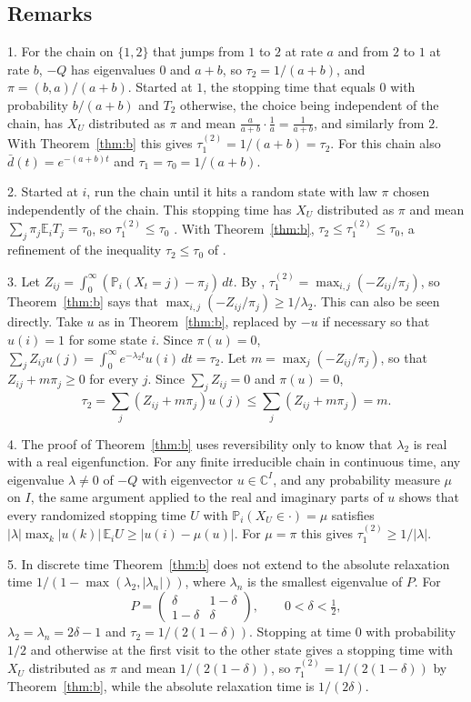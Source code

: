 \documentclass[11pt]{amsart}
\numberwithin{equation}{section}
\newcommand{\Pp}{\mathbb P}
\newcommand{\E}{\mathbb E}
\newcommand{\dbar}{\bar d}
\begin{document}
\subsection*{Remarks}
1. For the chain on $\{1,2\}$ that jumps from $1$ to $2$ at rate $a$ and from $2$ to $1$ at rate $b$, $-Q$ has eigenvalues $0$ and $a+b$, so $\tau_2=1/(a+b)$, and $\pi=(b,a)/(a+b)$. Started at $1$, the stopping time that equals $0$ with probability $b/(a+b)$ and $T_2$ otherwise, the choice being independent of the chain, has $X_U$ distributed as $\pi$ and mean $\frac a{a+b}\cdot\frac1a=\frac1{a+b}$, and similarly from $2$. With Theorem~\ref{thm:b} this gives $\tau_1^{(2)}=1/(a+b)=\tau_2$. For this chain also $\dbar(t)=e^{-(a+b)t}$ and $\tau_1=\tau_0=1/(a+b)$.

2. Started at $i$, run the chain until it hits a random state with law $\pi$ chosen independently of the chain. This stopping time has $X_U$ distributed as $\pi$ and mean $\sum_j\pi_j\E_iT_j=\tau_0$, so $\tau_1^{(2)}\le\tau_0$ \cite[Section~4.3.2]{AF}. With Theorem~\ref{thm:b}, $\tau_2\le\tau_1^{(2)}\le\tau_0$, a refinement of the inequality $\tau_2\le\tau_0$ of \cite[Lemma~4.24]{AF}.

3. Let $Z_{ij}=\int_0^\infty(\Pp_i(X_t=j)-\pi_j)\,dt$. By \cite[(4.47)]{AF}, $\tau_1^{(2)}=\max_{i,j}(-Z_{ij}/\pi_j)$, so Theorem~\ref{thm:b} says that $\max_{i,j}(-Z_{ij}/\pi_j)\ge1/\lambda_2$. This can also be seen directly. Take $u$ as in Theorem~\ref{thm:b}, replaced by $-u$ if necessary so that $u(i)=1$ for some state $i$. Since $\pi(u)=0$, $\sum_jZ_{ij}u(j)=\int_0^\infty e^{-\lambda_2t}u(i)\,dt=\tau_2$. Let $m=\max_j(-Z_{ij}/\pi_j)$, so that $Z_{ij}+m\pi_j\ge0$ for every $j$. Since $\sum_jZ_{ij}=0$ and $\pi(u)=0$,
\[
\tau_2=\sum_j(Z_{ij}+m\pi_j)u(j)\le\sum_j(Z_{ij}+m\pi_j)=m.
\]

4. The proof of Theorem~\ref{thm:b} uses reversibility only to know that $\lambda_2$ is real with a real eigenfunction. For any finite irreducible chain in continuous time, any eigenvalue $\lambda\ne0$ of $-Q$ with eigenvector $u\in\mathbb C^I$, and any probability measure $\mu$ on $I$, the same argument applied to the real and imaginary parts of $u$ shows that every randomized stopping time $U$ with $\Pp_i(X_U\in\cdot)=\mu$ satisfies $|\lambda|\max_k|u(k)|\,\E_iU\ge|u(i)-\mu(u)|$. For $\mu=\pi$ this gives $\tau_1^{(2)}\ge1/|\lambda|$.

5. In discrete time Theorem~\ref{thm:b} does not extend to the absolute relaxation time $1/(1-\max(\lambda_2,|\lambda_n|))$, where $\lambda_n$ is the smallest eigenvalue of $P$. For
\[
P=\begin{pmatrix}\delta&1-\delta\\1-\delta&\delta\end{pmatrix},\qquad0<\delta<\tfrac12,
\]
$\lambda_2=\lambda_n=2\delta-1$ and $\tau_2=1/(2(1-\delta))$. Stopping at time $0$ with probability $1/2$ and otherwise at the first visit to the other state gives a stopping time with $X_U$ distributed as $\pi$ and mean $1/(2(1-\delta))$, so $\tau_1^{(2)}=1/(2(1-\delta))$ by Theorem~\ref{thm:b}, while the absolute relaxation time is $1/(2\delta)$.
\end{document}
